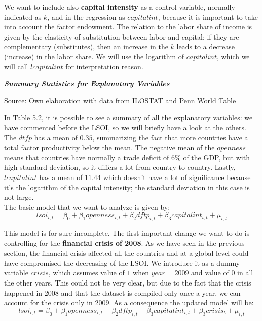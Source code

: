 \documentclass[12pt, letterpaper]{article}
\numberwithin{table}{section}   %
\begin{document}
We want to include also \textbf{capital intensity} as a control variable, normally indicated as $k$, and in the regression as $capitalint$, because it is important to take into account the factor endowment. The relation to the labor share of income is given by the elasticity of substitution between labor and capital: if they are complementary (substitutes), then an increase in the $k$ leads to a decrease (increase) in the labor share. We will use the logarithm of $capitalint$, which we will call $lcapitalint$ for interpretation reason. 


\begin{table}[htbp!]
\small
\caption{\textbf{\textit{Summary Statistics for Explanatory Variables}}} \label{tab:sum}
    \begin{center}
        
    \end{center} 
\centering\footnotesize Source: Own elaboration with data from ILOSTAT and Penn World Table
\end{table}

In Table 5.2, it is possible to see a summary of all the explanatory variables: we have commented before the LSOI, so we will briefly have a look at the others. The $dtfp$ has a mean of $0.35$, summarizing the fact that more countries have a total factor productivity below the mean. The negative mean of the $openness$ means that countries have normally a trade deficit of $6\%$ of the GDP, but with high standard deviation, so it differs a lot from country to country. Lastly, $lcapitalint$ has a mean of $11.44$ which doesn't have a lot of significance because it's the logarithm of the capital intensity; the standard deviation in this case is not large.\\

The basic model that we want to analyze is given by:
\begin{equation*}
    lsoi_{i,t} = \beta_0 + \beta_1 openness_{i,t} +\beta_2 dftp_{i,t} + \beta_3 capitalint_{i,t} + \mu_{i,t}
\end{equation*}


This model is for sure incomplete. The first important change we want to do is controlling for the \textbf{financial crisis of 2008}. As we have seen in the previous section, the financial crisis affected all the countries and at a global level could have compromised the decreasing of the LSOI. We introduce it as a dummy variable $crisis$, which assumes value of $1$ when $year = 2009$ and value of $0$ in all the other years. This could not be very clear, but due to the fact that the crisis happened in $2008$ and that the dataset is compiled only once a year, we can account for the crisis only in $2009$. As a consequence the updated model will be:
\begin{equation*}
    lsoi_{i,t} = \beta_0 + \beta_1 openness_{i,t} +\beta_2 dftp_{i,t} + \beta_3 capitalint_{i,t}  + \beta_3crisis_t + \mu_{i,t}
\end{equation*}
\end{document}
